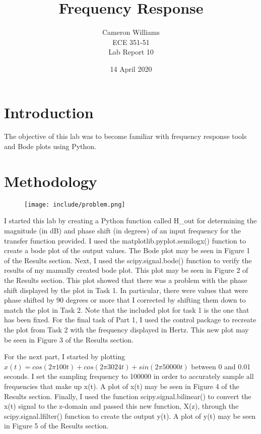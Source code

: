 \documentclass[12pt]{article}
\title{Frequency Response}
\author{Cameron Williams\\ECE 351-51\\Lab Report 10}
\date{14 April 2020}
\begin{document}
\vspace{\fill}
\maketitle
\vspace{\fill}
\clearpage

\newpage
\section{Introduction}
    \par The objective of this lab was to become familiar with frequency response tools and Bode plots using Python.

\section{Methodology}
    \begin{figure}[H]
    \centering
    \texttt{[image: include/problem.png]}
    \end{figure}
    \par I started this lab by creating a Python function called H\_out for determining the magnitude (in dB) and phase shift (in degrees) of an input frequency for the transfer function provided. I used the matplotlib.pyplot.semilogx() function to create a bode plot of the output values. The Bode plot may be seen in Figure 1 of the Results section. Next, I used the scipy.signal.bode() function to verify the results of my manually created bode plot. This plot may be seen in Figure 2 of the Results section. This plot showed that there was a problem with the phase shift displayed by the plot in Task 1. In particular, there were values that were phase shifted by 90 degrees or more that I corrected by shifting them down to match the plot in Task 2. Note that the included plot for task 1 is the one that has been fixed. For the final task of Part 1, I used the control package to recreate the plot from Task 2 with the frequency displayed in Hertz. This new plot may be seen in Figure 3 of the Results section.
    \par For the next part, I started by plotting $ x(t) = cos(2\pi 100t) + cos(2\pi 3024t) + sin(2\pi 50000t) $ between 0 and 0.01 seconds. I set the sampling frequency to 100000 in order to accurately sample all frequencies that make up x(t). A plot of x(t) may be seen in Figure 4 of the Results section. Finally, I used the function scipy.signal.bilinear() to convert the x(t) signal to the z-domain and passed this new function, X(z), through the scipy.signal.lfilter() function to create the output y(t). A plot of y(t) may be seen in Figure 5 of the Results section.
    
\end{document}
